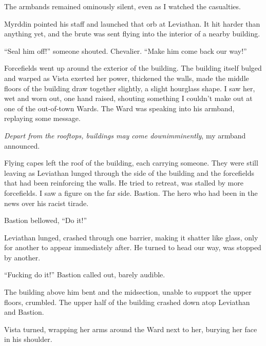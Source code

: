 The armbands remained ominously silent, even as I watched the casualties.



Myrddin pointed his staff and launched that orb at Leviathan.  It hit harder than anything yet, and the brute was sent flying into the interior of a nearby building.



``Seal him off!'' someone shouted.  Chevalier.  ``Make him come back our way!''



Forcefields went up around the exterior of the building.  The building itself bulged and warped as Vista exerted her power, thickened the walls, made the middle floors of the building draw together slightly, a slight hourglass shape.  I saw her, wet and worn out, one hand raised, shouting something I couldn't make out at one of the out-of-town Wards.  The Ward was speaking into his armband, replaying some message.



\emph{Depart from the rooftops, buildings may come down}\emph{imminently}, my armband announced.



Flying capes left the roof of the building, each carrying someone.  They were still leaving as Leviathan lunged through the side of the building and the forcefields that had been reinforcing the walls.  He tried to retreat, was stalled by more forcefields.  I saw a figure on the far side.  Bastion.  The hero who had been in the news over his racist tirade.



Bastion bellowed, ``Do it!''



Leviathan lunged, crashed through one barrier, making it shatter like glass, only for another to appear immediately after.  He turned to head our way, was stopped by another.



``Fucking do it!'' Bastion called out, barely audible.



The building above him bent and the midsection, unable to support the upper floors, crumbled.  The upper half of the building crashed down atop Leviathan and Bastion.



Vista turned, wrapping her arms around the Ward next to her, burying her face in his shoulder.




